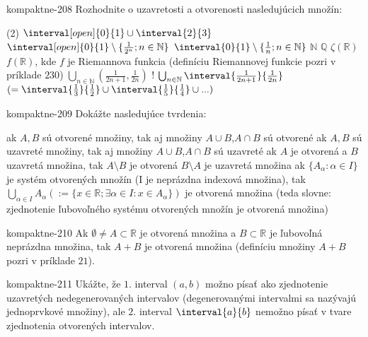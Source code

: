 \begin{defproblem}{kompaktne-208}
Rozhodnite o uzavretosti a otvorenosti nasledujúcich množín:
\begin{tasks}(2)
    \task
        $\interval[open]{0}{1} \cup \interval{2}{3}$
    \task
        $\interval[open]{0}{1} \setminus \{\frac{1}{2^n}; n \in \mathbb{N}\}$
    \task $\interval{0}{1} \setminus \{\frac{1}{n}; n \in \mathbb{N}\}$
    \task $\mathbb{N}$
    \task $\mathbb{Q}$
    \task $\zeta(\mathbb{R})$
    \task
        $f(\mathbb{R})$, kde $f$ je Riemannova funkcia (definíciu Riemannovej
        funkcie pozri v príklade $230$)
    \task $\bigcup_{n \in \mathbb{N}} (\frac{1}{2n+1},\frac{1}{2n})$
    \task!
        $\bigcup_{n \in \mathbb{N}} \interval{\frac{1}{2n+1}}{\frac{1}{2n}}$
        $(= \interval{\frac{1}{3}}{\frac{1}{2}}
        \cup \interval{\frac{1}{5}}{\frac{1}{4}} \cup ...)$
\end{tasks}
\end{defproblem}

\begin{defproblem}{kompaktne-209}
Dokážte nasledujúce tvrdenia:
\begin{tasks}
\task
    ak $A,B$ sú otvorené množiny, tak aj množiny $A \cup B$,$A \cap B$ sú
    otvorené
\task
    ak $A,B$ sú uzavreté množiny, tak aj množiny $A \cup B$,$A \cap B$ sú
    uzavreté
\task
    ak $A$ je otvorená a $B$ uzavretá množina, tak $A \setminus B$ je otvorená
    $B \setminus A$ je uzavretá množina
\task
    ak $\{A_{\alpha}: \alpha \in I\}$ je systém otvorených množín (I je
    neprázdna indexová množina), tak $\bigcup_{\alpha \in I} A_\alpha (:=\{x \in
    \mathbb{R}; \exists \alpha \in I: x \in A_\alpha\})$ je otvorená množina
    (teda slovne: zjednotenie ľubovoľného systému otvorených množín je otvorená
    množina)
\end{tasks}
\end{defproblem}

\begin{defproblem}{kompaktne-210}
Ak $\emptyset \neq A \subset \mathbb{R}$ je otvorená množina a $B \subset
\mathbb{R}$ je ľubovoľná neprázdna množina, tak $A+B$ je otvorená množina
(definíciu množiny $A+B$ pozri v príklade $21$).
\end{defproblem}

\begin{defproblem}{kompaktne-211}
Ukážte, že $1.$ interval $(a,b)$ možno písať ako zjednotenie uzavretých
nedegenerovaných intervalov (degenerovanými intervalmi sa nazývajú jednoprvkové
množiny), ale $2.$ interval $\interval{a}{b}$ nemožno písať v tvare zjednotenia
otvorených intervalov.
\end{defproblem}

